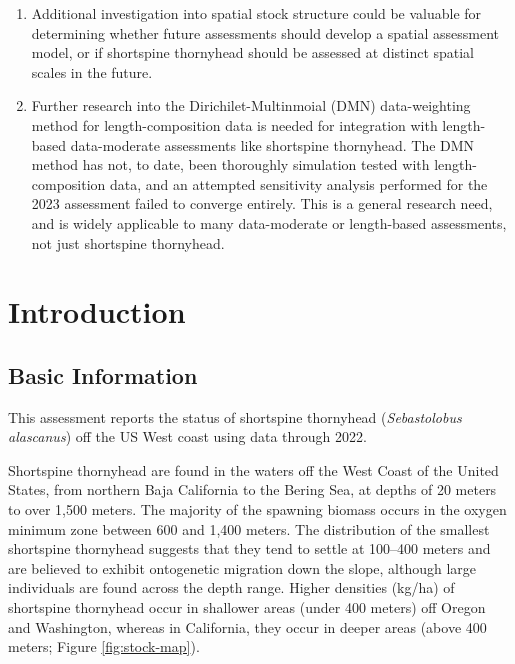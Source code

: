 \documentclass[11pt,
  english,
  letterpaper,
]{article}
\begin{document}
\begin{enumerate}
\item
  Additional investigation into spatial stock structure could be valuable for determining whether future assessments should develop a spatial assessment model, or if shortspine thornyhead should be assessed at distinct spatial scales in the future.
\item
  Further research into the Dirichilet-Multinmoial (DMN) data-weighting method for length-composition data is needed for integration with length-based data-moderate assessments like shortspine thornyhead. The DMN method has not, to date, been thoroughly simulation tested with length-composition data, and an attempted sensitivity analysis performed for the 2023 assessment failed to converge entirely. This is a general research need, and is widely applicable to many data-moderate or length-based assessments, not just shortspine thornyhead.
\end{enumerate}

\pagebreak
\setlength{\parskip}{5mm plus1mm minus1mm}
\setcounter{page}{1}
\renewcommand{\thefigure}{\arabic{figure}}
\renewcommand{\thetable}{\arabic{table}}
\setcounter{table}{0}
\setcounter{figure}{0}

\hypertarget{introduction}{%
\section{Introduction}\label{introduction}}

\hypertarget{basic-information}{%
\subsection{Basic Information}\label{basic-information}}

This assessment reports the status of shortspine thornyhead (\emph{Sebastolobus alascanus}) off the US West coast using data through 2022.

Shortspine thornyhead are found in the waters off the West Coast of the United States, from northern Baja California to the Bering Sea, at depths of 20 meters to over 1,500 meters. The majority of the spawning biomass occurs in the oxygen minimum zone between 600 and 1,400 meters. The distribution of the smallest shortspine thornyhead suggests that they tend to settle at 100--400 meters and are believed to exhibit ontogenetic migration down the slope, although large individuals are found across the depth range. Higher densities (kg/ha) of shortspine thornyhead occur in shallower areas (under 400 meters) off Oregon and Washington, whereas in California, they occur in deeper areas (above 400 meters; Figure \ref{fig:stock-map}).
\end{document}
